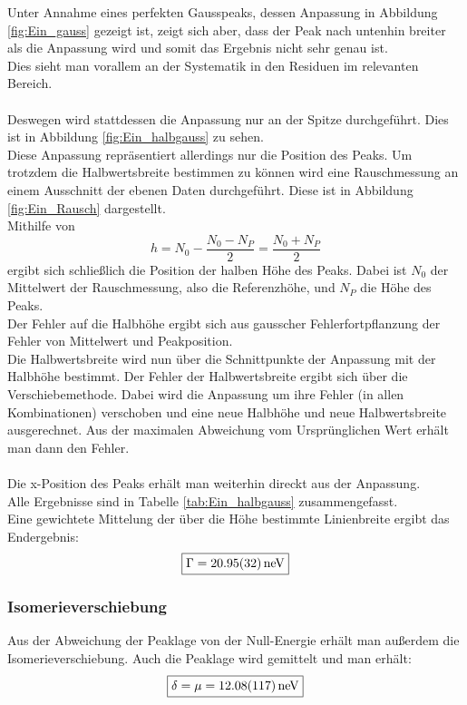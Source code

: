 \documentclass[12pt,a4paper]{article}
\begin{document}
Unter Annahme eines perfekten Gausspeaks, dessen Anpassung in Abbildung \ref{fig:Ein_gauss} gezeigt ist, zeigt sich aber, dass der Peak nach untenhin breiter als die Anpassung wird und somit das Ergebnis nicht sehr genau ist.\\
Dies sieht man vorallem an der Systematik in den Residuen im relevanten Bereich.\\
\\
Deswegen wird stattdessen die Anpassung nur an der Spitze durchgeführt. Dies ist in Abbildung \ref{fig:Ein_halbgauss} zu sehen.\\
Diese Anpassung repräsentiert allerdings nur die Position des Peaks. Um trotzdem die Halbwertsbreite bestimmen zu können wird eine Rauschmessung an einem Ausschnitt der ebenen Daten durchgeführt. Diese ist in Abbildung \ref{fig:Ein_Rausch} dargestellt.\\
Mithilfe von 
\begin{equation}
h = N_0 - \dfrac{N_0-N_P}{2} = \dfrac{N_0+N_P}{2}
\end{equation}
ergibt sich schließlich die Position der halben Höhe des Peaks. Dabei ist $N_0$ der Mittelwert der Rauschmessung, also die Referenzhöhe, und $N_P$ die Höhe des Peaks.\\
Der Fehler auf die Halbhöhe ergibt sich aus gausscher Fehlerfortpflanzung der Fehler von Mittelwert und Peakposition.\\
Die Halbwertsbreite wird nun über die Schnittpunkte der Anpassung mit der Halbhöhe bestimmt. Der Fehler der Halbwertsbreite ergibt sich über die Verschiebemethode. Dabei wird die Anpassung um ihre Fehler (in allen Kombinationen) verschoben und eine neue Halbhöhe und neue Halbwertsbreite ausgerechnet. Aus der maximalen Abweichung vom Ursprünglichen Wert erhält man dann den Fehler.\\
\\
Die x-Position des Peaks erhält man weiterhin direckt aus der Anpassung.\\
Alle Ergebnisse sind in Tabelle \ref{tab:Ein_halbgauss} zusammengefasst.\\
Eine gewichtete Mittelung der über die Höhe bestimmte Linienbreite ergibt das Endergebnis:
\begin{equation*}
\boxed{\Gamma = \SI{20.95\pm 0.32}{neV}}
\end{equation*}

\subsubsection{Isomerieverschiebung}
Aus der Abweichung der Peaklage von der Null-Energie erhält man außerdem die Isomerieverschiebung. Auch die Peaklage wird gemittelt und man erhält:
\begin{equation*}
\boxed{\delta = \mu = \SI{12.08\pm 1.17}{neV}}
\end{equation*}
\end{document}
